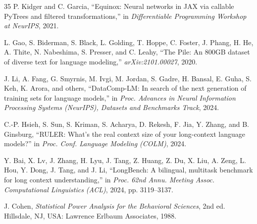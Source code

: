 \documentclass[journal]{IEEEtran}
\begin{document}
\begin{thebibliography}{35}
P. Kidger and C. Garcia, ``Equinox: Neural networks in JAX via callable PyTrees and
filtered transformations,'' in \emph{Differentiable Programming Workshop at NeurIPS},
2021.

L. Gao, S. Biderman, S. Black, L. Golding, T. Hoppe, C. Foster, J. Phang, H. He,
A. Thite, N. Nabeshima, S. Presser, and C. Leahy, ``The Pile: An 800GB dataset of
diverse text for language modeling,'' \emph{arXiv:2101.00027}, 2020.

J. Li, A. Fang, G. Smyrnis, M. Ivgi, M. Jordan, S. Gadre, H. Bansal, E. Guha,
S. Keh, K. Arora, and others, ``DataComp-LM: In search of the next generation of
training sets for language models,'' in \emph{Proc. Advances in Neural Information
Processing Systems (NeurIPS), Datasets and Benchmarks Track}, 2024.

C.-P. Hsieh, S. Sun, S. Kriman, S. Acharya, D. Rekesh, F. Jia, Y. Zhang, and
B. Ginsburg, ``RULER: What's the real context size of your long-context language
models?'' in \emph{Proc. Conf. Language Modeling (COLM)}, 2024.

Y. Bai, X. Lv, J. Zhang, H. Lyu, J. Tang, Z. Huang, Z. Du, X. Liu, A. Zeng, L. Hou,
Y. Dong, J. Tang, and J. Li, ``LongBench: A bilingual, multitask benchmark for long
context understanding,'' in \emph{Proc. 62nd Annu. Meeting Assoc. Computational
Linguistics (ACL)}, 2024, pp. 3119--3137.

J. Cohen, \emph{Statistical Power Analysis for the Behavioral Sciences}, 2nd ed.
Hillsdale, NJ, USA: Lawrence Erlbaum Associates, 1988.

\end{thebibliography}
\end{document}
